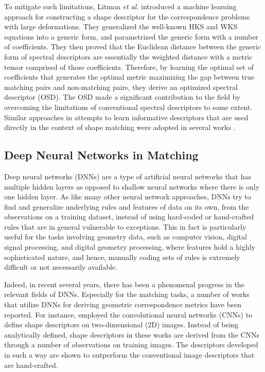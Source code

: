 \documentclass[5p,twocolumn,10pt,times]{elsarticle}
\begin{document}
To mitigate such limitations, Litman \textit{et al}. \cite{litman2014learning} introduced a machine learning approach for constructing a shape descriptor for the correspondence problems with large deformations. They generalized the well-known HKS and WKS equations into a generic form, and parametrized the generic form with a number of coefficients. They then proved that the Euclidean distance between the generic form of spectral descriptors are essentially the weighted distance with a metric tensor comprised of those coefficients. Therefore, by learning the optimal set of coefficients that generates the optimal metric maximizing the gap between true matching pairs and non-matching pairs, they derive an optimized spectral descriptor (OSD). The OSD made a significant contribution to the field by overcoming the limitations of conventional spectral descriptors to some extent. Similar approaches in attempts to learn informative descriptors that are used directly in the context of shape matching were adopted in several works \cite{windheuser2014optimal,corman2014supervised,rodola2014dense}. 

\subsection{Deep Neural Networks in Matching}

Deep neural networks (DNNs) are a type of artificial neural networks that has multiple hidden layers as opposed to shallow neural networks where there is only one hidden layer. As like many other neural network approaches, DNNs try to find and generalize underlying rules and features of data on its own, from the observations on a training dataset, instead of using hard-coded or hand-crafted rules that are in general vulnerable to exceptions. This in fact is particularly useful for the tasks involving geometry data, such as computer vision, digital signal processing, and digital geometry processing, where features hold a highly sophisticated nature, and hence, manually coding sets of rules is extremely difficult or not necessarily available.

Indeed, in recent several years, there has been a phenomenal progress in the relevant fields of DNNs. Especially for the matching tasks, a number of works that utilize DNNs for deriving geometric correspondence metrics have been reported. For instance, \cite{simo2015discriminative,kumar2016learning,balntas2016pn} employed the convolutional neural networks (CNNs) to define shape descriptors on two-dimensional (2D) images. Instead of being analytically defined, shape descriptors in these works are derived from the CNNs through a number of observations on training images. The descriptors developed in such a way are shown to outperform the conventional image descriptors that are hand-crafted. 
\end{document}
